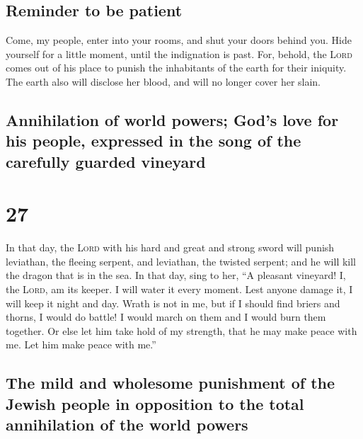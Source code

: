 \hypertarget{reminder-to-be-patient}{%
\subsection{Reminder to be patient}\label{reminder-to-be-patient}}

 Come, my people, enter into your rooms, and shut your
doors behind you. Hide yourself for a little moment, until the
indignation is past.  For, behold, the \textsc{Lord}
comes out of his place to punish the inhabitants of the earth for their
iniquity. The earth also will disclose her blood, and will no longer
cover her slain.

\hypertarget{annihilation-of-world-powers-gods-love-for-his-people-expressed-in-the-song-of-the-carefully-guarded-vineyard}{%
\subsection{Annihilation of world powers; God's love for his people,
expressed in the song of the carefully guarded
vineyard}\label{annihilation-of-world-powers-gods-love-for-his-people-expressed-in-the-song-of-the-carefully-guarded-vineyard}}

\hypertarget{section-26}{%
\section{27}\label{section-26}}

 In that day, the \textsc{Lord} with his hard and great
and strong sword will punish leviathan, the fleeing serpent, and
leviathan, the twisted serpent; and he will kill the dragon that is in
the sea.  In that day, sing to her, ``A pleasant vineyard!
 I, the \textsc{Lord}, am its keeper. I will water it
every moment. Lest anyone damage it, I will keep it night and day.
 Wrath is not in me, but if I should find briers and
thorns, I would do battle! I would march on them and I would burn them
together.  Or else let him take hold of my strength, that
he may make peace with me. Let him make peace with me.''

\hypertarget{the-mild-and-wholesome-punishment-of-the-jewish-people-in-opposition-to-the-total-annihilation-of-the-world-powers}{%
\subsection{The mild and wholesome punishment of the Jewish people in
opposition to the total annihilation of the world
powers}\label{the-mild-and-wholesome-punishment-of-the-jewish-people-in-opposition-to-the-total-annihilation-of-the-world-powers}}


